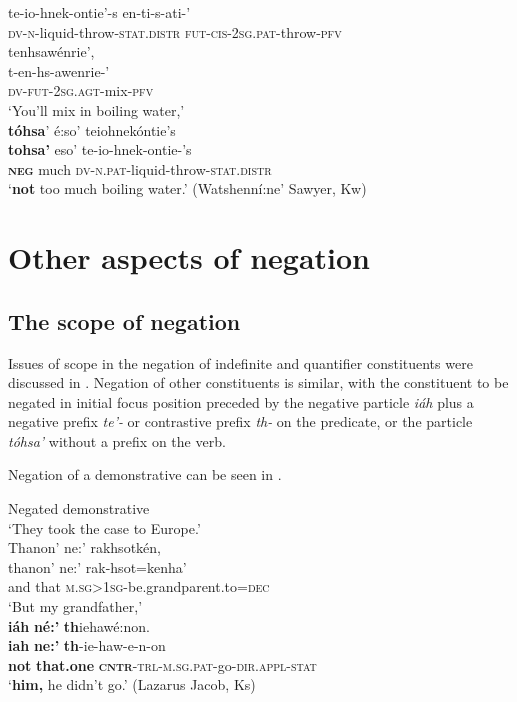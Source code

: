 \documentclass[output=paper,colorlinks,citecolor=brown]{langscibook}
\begin{document}
                te-io-hnek-ontie’-s		en-ti-s-ati-’		\\
            \textsc{dv-n}-liquid-throw-\textsc{stat.distr}	\textsc{fut-cis-2sg.pat}-throw-\textsc{pfv} \\
        \glt
        {\qquad} \glll  tenhsawénrie’, \\
                t-en-hs-awenrie-’ \\
            \textsc{dv-fut-2sg.agt}-mix-\textsc{pfv} \\
        \glt ‘You’ll mix in boiling water,’\\ \medskip
    \ex\label{ex:moh:89g}
        \glll \textbf{tóhsa}’ é:so’ teiohnekóntie’s \\
             \textbf{tohsa’} eso’ te-io-hnek-ontie-’s \\
             \textbf{\textsc{neg}} much \textsc{dv-n.pat}-liquid-throw-\textsc{stat.distr}\\
        \glt ‘\textbf{not} too much boiling water.’ (Watshenní:ne’ Sawyer, Kw)\\  \medskip
    \z
\z 


\section{Other aspects of negation}

\subsection{The scope of negation}

Issues of scope in the negation of indefinite and quantifier constituents were discussed in . Negation of other constituents is similar, with the constituent to be negated in initial focus position preceded by the negative particle \textit{iáh} plus a negative prefix \textit{te’-} or contrastive prefix \textit{th-} on the predicate, or the particle \textit{tóhsa’} without a prefix on the verb.

Negation of a demonstrative can be seen in .

\ea\label{ex:moh:90}Negated demonstrative\\
    \glt ‘They took the case to Europe.’\\ \medskip
    \glll Thanon’ ne:’ rakhsotkén, \\ 
          thanon’ ne:’ rak-hsot=kenha’ \\ 
          and that \textsc{m.sg>1sg}-be.grandparent.to=\textsc{dec} \\
    \glt ‘But my grandfather,’\\ \medskip
    \glll  \textbf{iáh} \textbf{né:’} \textbf{th}iehawé:non. \\
          \textbf{iah} \textbf{ne:’} \textbf{th}-ie-haw-e-n-on \\
          \textbf{not} \textbf{that.one} \textsc{\textbf{cntr}-trl-m.sg.pat}-go-\textsc{dir.appl-stat}\\
    \glt  ‘\textbf{him,} he didn’t go.’ (Lazarus Jacob, Ks) 
\z 
\end{document}

